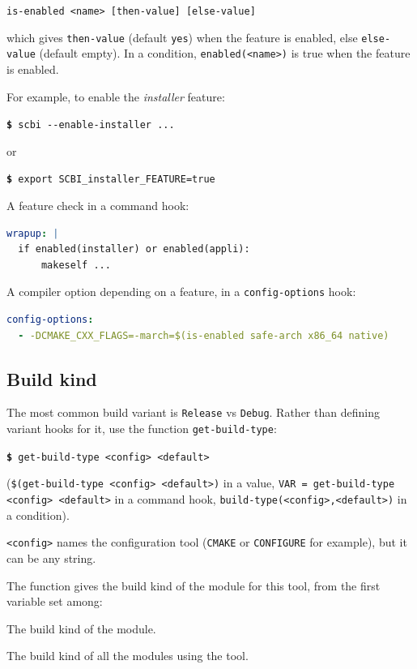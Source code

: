 \documentclass[a4paper,12pt,twoside]{article}
\newcommand{\code}[1]{\texttt{#1}}
\renewcommand{\emph}[1]{\textit{#1}}
\newcommand{\cmd}[1]{\tabto{1cm}\hspace{0.5cm}\texttt{\textbf{\$} #1}}
\newcommand{\ddash}{-{}-}
\begin{document}
\code{is-enabled <name> [then-value] [else-value]}

which gives \code{then-value} (default \code{yes}) when the feature is enabled, else \code{else-value} (default empty). In a condition, \code{enabled(<name>)} is true when the feature is enabled.

For example, to enable the \emph{installer} feature:

\cmd{scbi \ddash{}enable-installer ...}

or

\cmd{export SCBI\_installer\_FEATURE=true}

A feature check in a command hook:

\begin{lstlisting}[language={yaml}]
wrapup: |
  if enabled(installer) or enabled(appli):
      makeself ...
\end{lstlisting}

A compiler option depending on a feature, in a \code{config-options} hook:

\begin{lstlisting}[language={yaml}]
config-options:
  - -DCMAKE_CXX_FLAGS=-march=$(is-enabled safe-arch x86_64 native)
\end{lstlisting}

\subsection{Build kind}
\label{build-kind}
 

The most common build variant is \code{Release} vs \code{Debug}. Rather than defining variant hooks for it, use the function \code{get-build-type}:

\cmd{get-build-type <config> <default>}

(\code{\$(get-build-type <config> <default>)} in a value,
\code{VAR = get-build-type <config> <default>} in a command hook,
\code{build-type(<config>,<default>)} in a condition).

\code{<config>} names the configuration tool (\code{CMAKE} or \code{CONFIGURE} for example), but it can be any string.

The function gives the build kind of the module for this tool, from the first variable set among:

\begin{description}[style=nextline]
	\item [SCBI\_<module>\_BUILD\_TYPE] The build kind of the module.
	\item [SCBI\_<CONFIG>\_BUILD\_TYPE] The build kind of all the modules using the tool.
\end{description}
\end{document}
